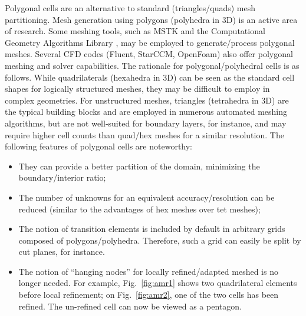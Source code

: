 \documentclass[preprint,10pt]{elsarticle}
\newcommand{\fig}[1]{Fig.~\ref{#1}}                      %
\begin{document}
Polygonal cells are an alternative to standard (triangles/quads) mesh partitioning.
Mesh generation using polygons (polyhedra in 3D) is an active area of research.
Some meshing tools, such as MSTK \cite{garimella-2004-mstk} and the Computational Geometry Algorithms 
Library \cite{cgal,cgal:gw-p2-12b}, may be employed to generate/process polygonal meshes.  
Several CFD codes (Fluent, StarCCM, OpenFoam) also offer polygonal meshing and solver capabilities. 
%
The rationale for polygonal/polyhedral cells is as follows.
While quadrilaterals (hexahedra in 3D) can be seen as the standard cell shapes for logically 
structured meshes, they may be difficult to employ in complex geometries. For unstructured meshes,
triangles (tetrahedra in 3D) are the typical building blocks and are employed in 
numerous automated meshing algorithms, but are not well-suited for boundary layers, 
for instance, and may require higher cell counts than quad/hex meshes for a similar
resolution.  The following features of polygonal cells are noteworthy:
\begin{itemize}
  \item They can provide a better partition of the domain, minimizing the boundary/interior ratio;
  \item The number of unknowns for an equivalent accuracy/resolution can be reduced (similar to the advantages of 
	hex meshes over tet meshes);
	\item The notion of transition elements is included by default in arbitrary grids composed of
	polygons/polyhedra. Therefore, such a grid can easily be split by cut planes, for 
	instance. 
  \item The notion of ``hanging nodes'' for locally refined/adapted meshed is no longer needed.
	For example, \fig{fig:amr1} shows two quadrilateral elements before local refinement; on
	\fig{fig:amr2}, one of the two cells has been refined. The un-refined cell can now be viewed as a
	pentagon.
\end{itemize}
\end{document}
